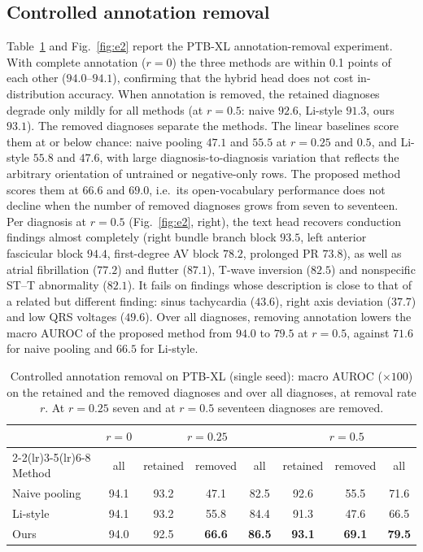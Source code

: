 \subsection{Controlled annotation removal}\label{sec:res_e2}
Table~\ref{tab:e2} and Fig.~\ref{fig:e2} report the PTB-XL annotation-removal experiment. With complete annotation ($r=0$) the three methods are within 0.1 points of each other ($94.0$--$94.1$), confirming that the hybrid head does not cost in-distribution accuracy. When annotation is removed, the retained diagnoses degrade only mildly for all methods (at $r=0.5$: naive $92.6$, Li-style $91.3$, ours $93.1$). The removed diagnoses separate the methods. The linear baselines score them at or below chance: naive pooling $47.1$ and $55.5$ at $r=0.25$ and $0.5$, and Li-style $55.8$ and $47.6$, with large diagnosis-to-diagnosis variation that reflects the arbitrary orientation of untrained or negative-only rows. The proposed method scores them at $66.6$ and $69.0$, i.e.\ its open-vocabulary performance does not decline when the number of removed diagnoses grows from seven to seventeen. Per diagnosis at $r=0.5$ (Fig.~\ref{fig:e2}, right), the text head recovers conduction findings almost completely (right bundle branch block $93.5$, left anterior fascicular block $94.4$, first-degree AV block $78.2$, prolonged PR $73.8$), as well as atrial fibrillation ($77.2$) and flutter ($87.1$), T-wave inversion ($82.5$) and nonspecific ST--T abnormality ($82.1$). It fails on findings whose description is close to that of a related but different finding: sinus tachycardia ($43.6$), right axis deviation ($37.7$) and low QRS voltages ($49.6$). Over all diagnoses, removing annotation lowers the macro AUROC of the proposed method from $94.0$ to $79.5$ at $r=0.5$, against $71.6$ for naive pooling and $66.5$ for Li-style.

\begin{table}[!htbp]
\centering\footnotesize
\setlength{\tabcolsep}{5pt}
\caption{Controlled annotation removal on PTB-XL (single seed): macro AUROC ($\times100$) on the retained and the removed diagnoses and over all diagnoses, at removal rate $r$. At $r=0.25$ seven and at $r=0.5$ seventeen diagnoses are removed.}\label{tab:e2}
\begin{tabular}{lccccccc}
\toprule
 & $r=0$ & \multicolumn{3}{c}{$r=0.25$} & \multicolumn{3}{c}{$r=0.5$} \\
\cmidrule(lr){2-2}\cmidrule(lr){3-5}\cmidrule(lr){6-8}
Method & all & retained & removed & all & retained & removed & all \\
\midrule
Naive pooling & 94.1 & 93.2 & 47.1 & 82.5 & 92.6 & 55.5 & 71.6 \\
Li-style & 94.1 & 93.2 & 55.8 & 84.4 & 91.3 & 47.6 & 66.5 \\
Ours & 94.0 & 92.5 & \textbf{66.6} & \textbf{86.5} & \textbf{93.1} & \textbf{69.1} & \textbf{79.5} \\
\bottomrule
\end{tabular}
\end{table}

